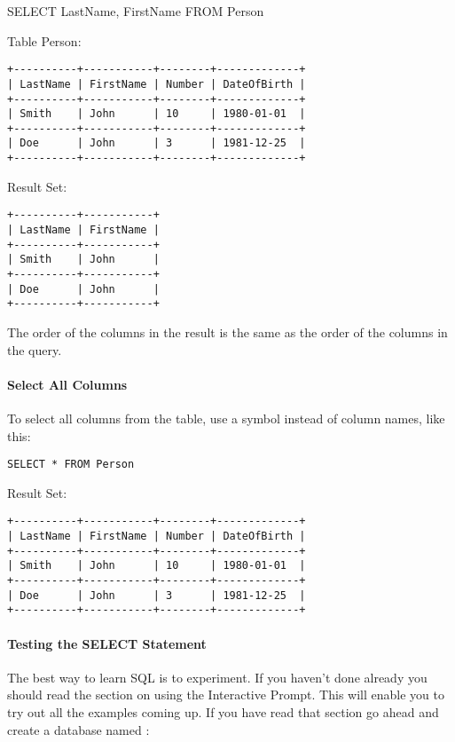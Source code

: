 \documentclass{howto}
\begin{document}
SELECT LastName, FirstName FROM Person

Table Person:
\begin{verbatim}
+----------+-----------+--------+-------------+
| LastName | FirstName | Number | DateOfBirth |
+----------+-----------+--------+-------------+
| Smith    | John      | 10     | 1980-01-01  |
+----------+-----------+--------+-------------+
| Doe      | John      | 3      | 1981-12-25  |
+----------+-----------+--------+-------------+
\end{verbatim}

Result Set:
\begin{verbatim}
+----------+-----------+
| LastName | FirstName |
+----------+-----------+
| Smith    | John      |
+----------+-----------+
| Doe      | John      |
+----------+-----------+
\end{verbatim}

The order of the columns in the result is the same as the order of the columns in the query.

\paragraph{Select All Columns}

To select all columns from the  table, use a \code{*} symbol instead of column names, like this: 

\begin{verbatim}
SELECT * FROM Person
\end{verbatim}

Result Set:
\begin{verbatim}
+----------+-----------+--------+-------------+
| LastName | FirstName | Number | DateOfBirth |
+----------+-----------+--------+-------------+
| Smith    | John      | 10     | 1980-01-01  |
+----------+-----------+--------+-------------+
| Doe      | John      | 3      | 1981-12-25  |
+----------+-----------+--------+-------------+
\end{verbatim}

\paragraph{Testing the SELECT Statement}

The best way to learn SQL is to experiment. If you haven't done already you should read the section on using the Interactive Prompt. This will enable you to try out all the examples coming up. If you have read that section go ahead and create a database named :
\end{document}
